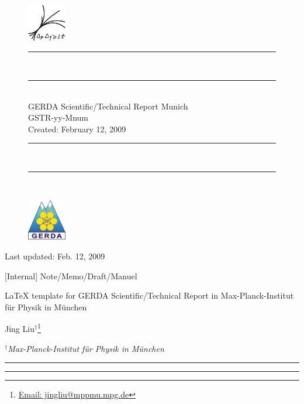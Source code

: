 \documentclass[11pt, a4paper]{article}
\begin{document}
\begin{titlepage}\centering

\begin{figure}[t!]\centering
  \includegraphics[width=0.15\textwidth]{logoMPPMU}\hfil
  \begin{minipage}[b]{0.5\linewidth}\centering
    \rule[-4.2mm]{\textwidth}{0.3mm}\\\rule{0.98\textwidth}{0.1mm}\\
    GERDA Scientific/Technical Report Munich\\\vspace{2mm}
    GSTR-yy-Mnum \\\vspace{2mm}
    Created: February 12, 2009\\\vspace{-7.5mm}
    \rule[-5mm]{0.98\textwidth}{0.1mm}\\\rule{\textwidth}{0.3mm}\\
  \end{minipage}\hfil
  \includegraphics[width=0.15\textwidth]{logoGERDA}%
\end{figure}

\begin{flushright}
Last updated: Feb. 12, 2009
\end{flushright}
\vspace{0.5cm}

\Large{[Internal] Note/Memo/Draft/Manuel}
\vspace{1cm}

\LARGE{\LaTeX{} template for GERDA Scientific/Technical Report in Max-Planck-Institut f\"ur Physik in M\"unchen}
\vspace{1cm}

\Large{Jing Liu$^{\dagger}$\footnote{ \href{mailto:jingliu@mppmu.mpg.de}{Email: jingliu@mppmu.mpg.de}}}
\vspace{0.5cm} 

\normalsize{$^{\dagger}$\textit{Max-Planck-Institut f\"ur Physik in M\"unchen}}
\vspace{0.5cm} 

\rule{0.9\textwidth}{0.1mm}
\begin{abstract}
  A \LaTeX{} template of the Scientific/Technical Report is created for the GERDA group in the Max-Planck-Institut f\"ur Physik in M\"unchen. The usage of the template is explained in detail in this note.
\end{abstract}
\rule{0.9\textwidth}{0.1mm}

\end{titlepage} 
\end{document}
